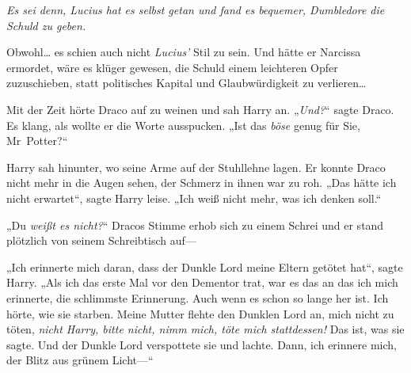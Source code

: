 \emph{Es sei denn, Lucius hat es selbst getan und fand es bequemer, Dumbledore die Schuld zu geben.}

Obwohl… es schien auch nicht \emph{Lucius'} Stil zu sein. Und hätte er Narcissa ermordet, wäre es klüger gewesen, die Schuld einem leichteren Opfer zuzuschieben, statt politisches Kapital und Glaubwürdigkeit zu verlieren…

Mit der Zeit hörte Draco auf zu weinen und sah Harry an. „\emph{Und?}“ sagte Draco. Es klang, als wollte er die Worte ausspucken. „Ist das \emph{böse} genug für Sie, Mr~Potter?“

Harry sah hinunter, wo seine Arme auf der Stuhllehne lagen. Er konnte Draco nicht mehr in die Augen sehen, der Schmerz in ihnen war zu roh. „Das hätte ich nicht erwartet“, sagte Harry leise. „Ich weiß nicht mehr, was ich denken soll.“

„Du \emph{weißt es nicht?}“ Dracos Stimme erhob sich zu einem Schrei und er stand plötzlich von seinem Schreibtisch auf—

„Ich erinnerte mich daran, dass der Dunkle Lord meine Eltern getötet hat“, sagte Harry. „Als ich das erste Mal vor den Dementor trat, war es das an das ich mich erinnerte, die schlimmste Erinnerung. Auch wenn es schon so lange her ist. Ich hörte, wie sie starben. Meine Mutter flehte den Dunklen Lord an, mich nicht zu töten, \emph{nicht Harry, bitte nicht, nimm mich, töte mich stattdessen!} Das ist, was sie sagte. Und der Dunkle Lord verspottete sie und lachte. Dann, ich erinnere mich, der Blitz aus grünem Licht—“

